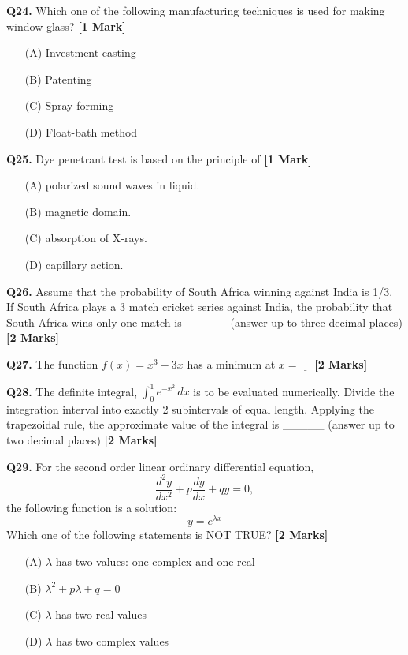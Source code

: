 \documentclass[11pt]{article}
\newcommand{\questiona}[2]{
    \noindent\textbf{Q#2.} #1 \hfill \textbf{[1 Mark]}
}
\newcommand{\questionb}[2]{
    \noindent\textbf{Q#2.} #1 \hfill \textbf{[2 Marks]}
}
\begin{document}
\questiona{Which one of the following manufacturing techniques is used for making window glass?}{24}
\begin{enumerate}
    \item[(A)] Investment casting
    \item[(B)] Patenting
    \item[(C)] Spray forming
    \item[(D)] Float-bath method
\end{enumerate}
\vspace{0.5cm}

\questiona{Dye penetrant test is based on the principle of}{25}
\begin{enumerate}
    \item[(A)] polarized sound waves in liquid.
    \item[(B)] magnetic domain.
    \item[(C)] absorption of X-rays.
    \item[(D)] capillary action.
\end{enumerate}
\vspace{0.5cm}

\questionb{Assume that the probability of South Africa winning against India is 1/3. If South Africa plays a 3 match cricket series against India, the probability that South Africa wins only one match is \_\_\_\_\_ (answer up to three decimal places)}{26}
\vspace{0.5cm}

\questionb{The function \( f(x) = x^3 - 3x \) has a minimum at \( x = \underline{\quad } \)}{27}
\vspace{0.5cm}

\questionb{The definite integral, \(\int_{0}^{1} e^{-x^2} \, dx\) is to be evaluated numerically. Divide the integration interval into exactly 2 subintervals of equal length. Applying the trapezoidal rule, the approximate value of the integral is \_\_\_\_\_ (answer up to two decimal places)}{28}
\vspace{0.5cm}

\questionb{For the second order linear ordinary differential equation,
\[\frac{d^2 y}{dx^2} + p \frac{dy}{dx} + qy = 0,\]
the following function is a solution:
\[y = e^{\lambda x}\]
Which one of the following statements is NOT TRUE?}{29}
\begin{enumerate}
    \item[(A)] \(\lambda\) has two values: one complex and one real
    \item[(B)] \(\lambda^2 + p\lambda + q = 0\)
    \item[(C)] \(\lambda\) has two real values
    \item[(D)] \(\lambda\) has two complex values
\end{enumerate}
\vspace{0.5cm}
\end{document}
